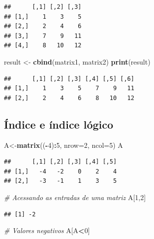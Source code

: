 \documentclass[
]{book}
\newenvironment{Shaded}{\begin{snugshade}}{\end{snugshade}}
\newcommand{\AttributeTok}[1]{\textcolor[rgb]{0.13,0.29,0.53}{#1}}
\newcommand{\CommentTok}[1]{\textcolor[rgb]{0.56,0.35,0.01}{\textit{#1}}}
\newcommand{\DecValTok}[1]{\textcolor[rgb]{0.00,0.00,0.81}{#1}}
\newcommand{\FunctionTok}[1]{\textcolor[rgb]{0.13,0.29,0.53}{\textbf{#1}}}
\newcommand{\NormalTok}[1]{#1}
\newcommand{\OtherTok}[1]{\textcolor[rgb]{0.56,0.35,0.01}{#1}}
\newcommand{\SpecialCharTok}[1]{\textcolor[rgb]{0.81,0.36,0.00}{\textbf{#1}}}
\begin{document}
\begin{verbatim}
##      [,1] [,2] [,3]
## [1,]    1    3    5
## [2,]    2    4    6
## [3,]    7    9   11
## [4,]    8   10   12
\end{verbatim}

\begin{Shaded}
\begin{Highlighting}[]
\NormalTok{result }\OtherTok{\textless{}{-}} \FunctionTok{cbind}\NormalTok{(matrix1, matrix2)}
\FunctionTok{print}\NormalTok{(result)}
\end{Highlighting}
\end{Shaded}

\begin{verbatim}
##      [,1] [,2] [,3] [,4] [,5] [,6]
## [1,]    1    3    5    7    9   11
## [2,]    2    4    6    8   10   12
\end{verbatim}

\subsection{Índice e índice lógico}\label{uxedndice-e-uxedndice-luxf3gico}

\begin{Shaded}
\begin{Highlighting}[]
\NormalTok{A}\OtherTok{\textless{}{-}}\FunctionTok{matrix}\NormalTok{((}\SpecialCharTok{{-}}\DecValTok{4}\NormalTok{)}\SpecialCharTok{:}\DecValTok{5}\NormalTok{, }\AttributeTok{nrow=}\DecValTok{2}\NormalTok{, }\AttributeTok{ncol=}\DecValTok{5}\NormalTok{)}
\NormalTok{A}
\end{Highlighting}
\end{Shaded}

\begin{verbatim}
##      [,1] [,2] [,3] [,4] [,5]
## [1,]   -4   -2    0    2    4
## [2,]   -3   -1    1    3    5
\end{verbatim}

\begin{Shaded}
\begin{Highlighting}[]
\CommentTok{\# Acessando as entradas de uma matriz}
\NormalTok{A[}\DecValTok{1}\NormalTok{,}\DecValTok{2}\NormalTok{]}
\end{Highlighting}
\end{Shaded}

\begin{verbatim}
## [1] -2
\end{verbatim}

\begin{Shaded}
\begin{Highlighting}[]
\CommentTok{\# Valores negativos }
\NormalTok{A[A}\SpecialCharTok{\textless{}}\DecValTok{0}\NormalTok{]}
\end{Highlighting}
\end{Shaded}
\end{document}
